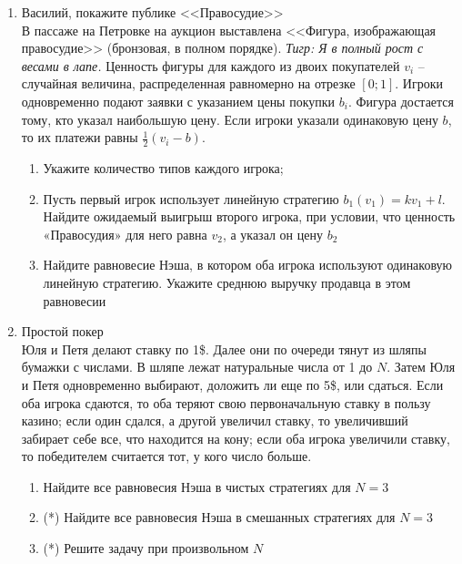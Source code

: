 \documentclass[pdftex,12pt,a4paper]{article}
\begin{document}
\begin{enumerate}

\item Василий, покажите публике <<Правосудие>>\\
В пассаже на Петровке на аукцион выставлена <<Фигура, изображающая правосудие>> (бронзовая, в полном порядке). \textit{Тигр: Я в полный рост с весами в лапе.} Ценность фигуры для каждого из двоих покупателей $v_i$ – случайная величина, распределенная равномерно на отрезке $\left[ {0;1} \right]$. Игроки одновременно подают заявки с указанием цены покупки $b_i$. Фигура достается тому, кто указал наибольшую цену. Если игроки указали одинаковую цену $b$, то их платежи равны $\frac{1}{2}\left( {v_i  - b} \right)$.
\begin{enumerate}
\item Укажите количество типов каждого игрока;
\item Пусть первый игрок использует линейную стратегию $b_1 \left( {v_1 } \right) = kv_1  + l$. Найдите ожидаемый выигрыш второго игрока, при условии, что ценность «Правосудия» для него равна $v_2 $, а указал он цену $b_2 $
\item Найдите равновесие Нэша, в котором оба игрока используют одинаковую линейную стратегию. Укажите среднюю выручку продавца в этом равновесии
\end{enumerate}

\item Простой покер\\
Юля и Петя делают ставку по 1\$. Далее они по очереди тянут из шляпы бумажки с числами. В шляпе лежат натуральные числа от 1 до $N$. Затем Юля и Петя одновременно выбирают, доложить ли еще по 5\$, или сдаться. Если оба игрока сдаются, то оба теряют свою первоначальную ставку в пользу казино; если один сдался, а другой увеличил ставку, то увеличивший забирает себе все, что находится на кону; если оба игрока увеличили ставку, то победителем считается тот, у кого число больше. 
\begin{enumerate}
\item Найдите все равновесия Нэша в чистых стратегиях для $N = 3$
\item (*) Найдите все равновесия Нэша в смешанных стратегиях для $N = 3$
\item (*) Решите задачу при произвольном $N$ 
\end{enumerate}


\end{enumerate}
\end{document}
